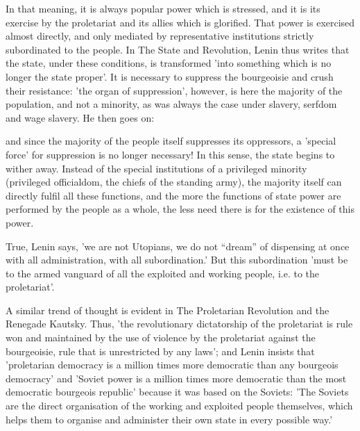 In that meaning, it is always popular power which is stressed, and it is its exercise by the proletariat and its allies which is glorified. That power is exercised almost directly, and only mediated by representative institutions strictly subordinated to the people. In The State and Revolution, Lenin thus writes that the state, under these conditions, is transformed 'into something which is no longer the state proper'. It is necessary to suppress the bourgeoisie and crush their resistance: 'the organ of suppression', however, is here the majority of the population, and not a minority, as was always the case under slavery, serfdom and wage slavery. He then goes on:
\begin{displayquote}
    and since the majority of the people itself suppresses its oppressors, a 'special force' for suppression is no longer necessary! In this sense, the state begins to wither away. Instead of the special institutions of a privileged minority (privileged officialdom, the chiefs of the standing army), the majority itself can directly fulfil all these functions, and the more the functions of state power are performed by the people as a whole, the less need there is for the existence of this power.
\end{displayquote}

True, Lenin says, 'we are not Utopians, we do not “dream” of dispensing at once with all administration, with all subordination.' But this subordination 'must be to the armed vanguard of all the exploited and working people, i.e. to the proletariat'.

A similar trend of thought is evident in The Proletarian Revolution and the Renegade Kautsky. Thus, 'the revolutionary dictatorship of the proletariat is rule won and maintained by the use of violence by the proletariat against the bourgeoisie, rule that is unrestricted by any laws'; and Lenin insists that 'proletarian democracy is a million times more democratic than any bourgeois democracy' and 'Soviet power is a million times more democratic than the most democratic bourgeois republic' because it was based on the Soviets: 'The Soviets are the direct organisation of the working and exploited people themselves, which helps them to organise and administer their own state in every possible way.'

